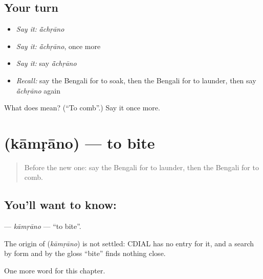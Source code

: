 \subsection*{Your turn}
\begin{itemize}
\raggedright
  \item \emph{Say it:} \emph{ā̃chṛāno}
  \item \emph{Say it:} \emph{ā̃chṛāno}, once more
  \item \emph{Say it:} say \emph{ā̃chṛāno}
  \item \emph{Recall:} say the Bengali for to soak, then the Bengali for to launder, then say \emph{ā̃chṛāno} again
\end{itemize}

\begin{tcolorbox}[breakable,colback=teal!4,colframe=teal!35!black,title={Before you move on}]
What does  mean? (\textquotedblleft{}To comb\textquotedblright{}.) Say it once more.
\end{tcolorbox}
\section[\texorpdfstring{\bn{কামড়ানো} (kāmṛāno)}{কামড়ানো (kāmṛāno)}]{ (kāmṛāno) — to bite}

\label{lesson:BN-C152-kamrano}



\begin{quote}
Before the new one: say the Bengali for to launder, then the Bengali for to comb.
\end{quote}

\subsection*{You'll want to know: }
\textbf{} — \emph{kāmṛāno} — \textquotedblleft{}to bite\textquotedblright{}.

\begin{cousinweb}
The origin of \textbf{} (\emph{kāmṛāno}) is not settled: CDIAL has no entry for it, and a search by form and by the gloss \textquotedblleft{}bite\textquotedblright{} finds nothing close.
\end{cousinweb}

\begin{grammarlens}[title={What you've built}]
One more word for this chapter.
\end{grammarlens}

